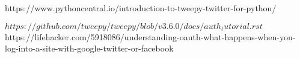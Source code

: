 \begin{singlespace}


https://www.pythoncentral.io/introduction-to-tweepy-twitter-for-python/

$https://github.com/tweepy/tweepy/blob/v3.6.0/docs/auth_tutorial.rst
$
https://lifehacker.com/5918086/understanding-oauth-what-happens-when-you-log-into-a-site-with-google-twitter-or-facebook

\end{singlespace}
